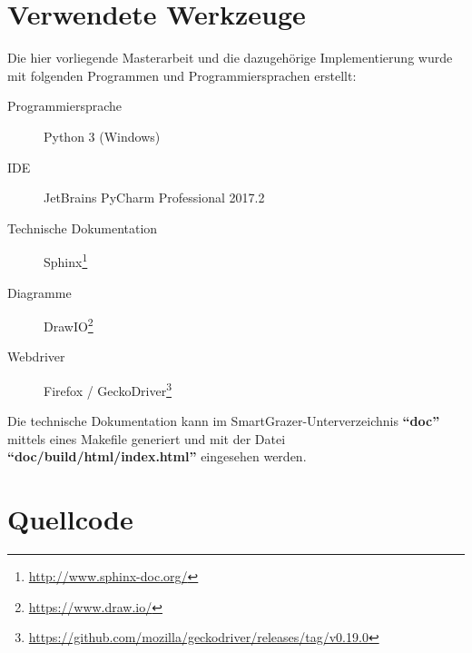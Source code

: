 \chapter{Verwendete Werkzeuge}

Die hier vorliegende Masterarbeit und die dazugehörige Implementierung wurde mit folgenden Programmen und Programmiersprachen erstellt:

\begin{description}
	\item[Programmiersprache] Python 3 (Windows)
	\item[\acs{IDE}] JetBrains PyCharm Professional 2017.2
	\item[Technische Dokumentation] Sphinx\footnote{\url{http://www.sphinx-doc.org/}}
	\item[Diagramme] DrawIO\footnote{\url{https://www.draw.io/}}
	\item[Webdriver] Firefox / GeckoDriver\footnote{\url{https://github.com/mozilla/geckodriver/releases/tag/v0.19.0}}
\end{description}

Die technische Dokumentation kann im SmartGrazer-Unterverzeichnis \textbf{``doc''} mittels eines Makefile generiert und mit der Datei \textbf{``doc/build/html/index.html''} eingesehen werden. 

\chapter{Quellcode}

